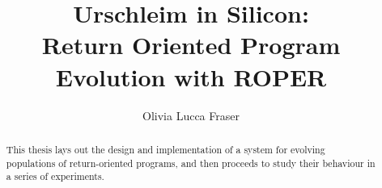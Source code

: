 \title{Urschleim in Silicon:\\Return Oriented Program\\Evolution with ROPER}
\author{Olivia Lucca Fraser}

\mcs
{}

\frontmatter

\begin{abstract}
  This thesis lays out the design and implementation of a system for
  evolving populations of return-oriented programs, and then proceeds to study their
  behaviour in a series of experiments. 
\end{abstract}

\printnoidxglossaries
\clearpage
{}

